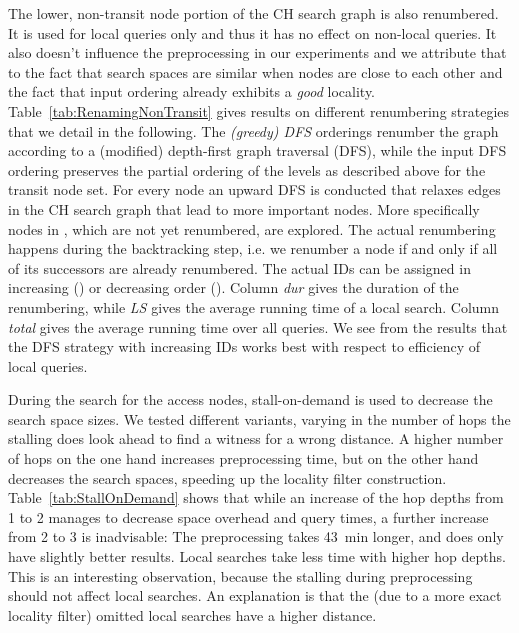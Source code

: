 \documentclass{llncs}
\begin{document}
The lower, non-transit node portion of the CH search graph is also renumbered.
It is used for local queries only and thus it has no effect on non-local queries.
It also doesn't influence the preprocessing in our experiments and we attribute that to the fact that search spaces are similar when nodes are close to each other and the fact that input ordering already exhibits a \emph{good} locality.
Table~\ref{tab:RenamingNonTransit} gives results on different renumbering strategies that we detail in the following.
The \emph{(greedy) DFS} orderings renumber the graph according to a (modified) depth-first graph traversal (DFS), while the input DFS ordering preserves the partial ordering of the levels as described above for the transit node set.
For every node an upward DFS is conducted that relaxes edges in the CH search graph that lead to more important nodes.
More specifically nodes in , which are not yet renumbered, are explored.
The actual renumbering happens during  the backtracking step, i.e. we renumber a node if and only if all of its successors are already renumbered. 
The actual IDs can be assigned in increasing () or decreasing order ().
Column \emph{dur} gives the duration of the renumbering, while \emph{LS} gives the average running time of a local search.
Column \emph{total} gives the average running time over all queries.
We see from the results that the DFS strategy with increasing IDs works best with respect to efficiency of local queries.

During the search for the access nodes, stall-on-demand is used to decrease the search space sizes. 
We tested different variants, varying in the number of hops the stalling does look ahead to find a witness for a wrong distance. 
A higher number of hops on the one hand increases preprocessing time, but on the other hand decreases the search spaces, speeding up the locality filter construction.
Table~\ref{tab:StallOnDemand} shows that while an increase of the hop depths from 1 to 2 manages to decrease space overhead and query times, a further increase from 2 to 3 is inadvisable: 
The preprocessing takes \SI{43}{\minute} longer, and does only have slightly better results.
Local searches take less time with higher hop depths. 
This is an interesting observation, because the stalling during preprocessing should not affect local searches. 
An explanation is that the (due to a more exact locality filter) omitted local searches have a higher distance.
\end{document}
